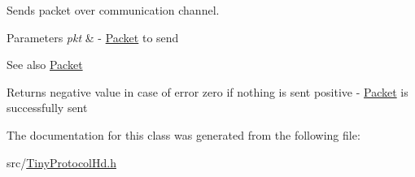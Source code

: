 Sends packet over communication channel. 
\begin{DoxyParams}{Parameters}
{\em pkt} & -\/ \hyperlink{classTiny_1_1Packet}{Packet} to send \\
\hline
\end{DoxyParams}
\begin{DoxySeeAlso}{See also}
\hyperlink{classTiny_1_1Packet}{Packet} 
\end{DoxySeeAlso}
\begin{DoxyReturn}{Returns}
negative value in case of error zero if nothing is sent positive -\/ \hyperlink{classTiny_1_1Packet}{Packet} is successfully sent 
\end{DoxyReturn}


The documentation for this class was generated from the following file\+:\begin{DoxyCompactItemize}
\item 
src/\hyperlink{TinyProtocolHd_8h}{Tiny\+Protocol\+Hd.\+h}\end{DoxyCompactItemize}
